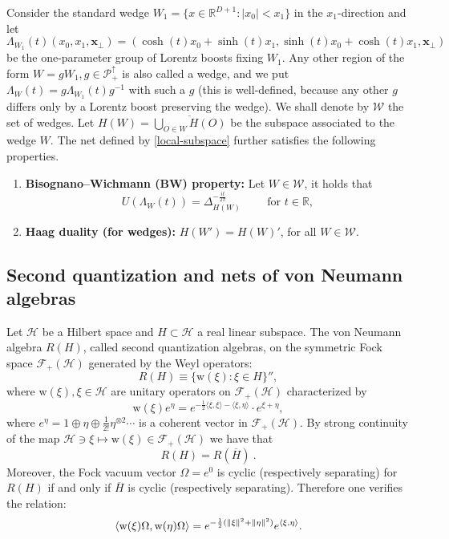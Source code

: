 \documentclass[12pt]{article}
\newcounter{axiomss}
\def\ol{\overline}
\def\RR{{\mathbb R}}
\def\H{{\mathcal H}}
\def\P{{\mathcal P}}
\def\<{\langle}
\def\>{\rangle}
\def\poincare{{\P^\uparrow_+}}
\def\tx{\pmb{x}}
\newcommand{\norm}[1]{\left\lVert#1\right\rVert}
\theoremstyle{remark}
\begin{document}
Consider the standard wedge $W_1=\{x\in\RR^{D+1}:|x_0|<x_1\}$ in the $x_1$-direction and let
\[
\Lambda_{W_1}(t)(x_0,x_1,\tx_\perp)=(\cosh(t)x_0+\sinh(t)x_1, \sinh(t)x_0+\cosh(t)x_1,\tx_\perp) 
\]
be the one-parameter group of Lorentz boosts fixing $W_1$.
Any other region of the form $W=gW_1, g \in \poincare$ is also called a wedge,
and we put $\Lambda_W(t) = g\Lambda_{W_1}(t)g^{-1}$ with such a $g$
(this is well-defined, because any other $g$ differs only by a Lorentz boost preserving the wedge).
We shall denote by $\mathcal W$ the set of wedges. Let $H(W)=\overline{\bigcup_{O\in W}H(O)}$ be the subspace associated to the wedge $W$.  The net defined by \eqref{local-subspace} further satisfies the following properties. 
\begin{enumerate}[{(SS}1{)}]
\setcounter{enumi}{\value{axiomss}} 
\item {\bf Bisognano--Wichmann (BW) property:} 
Let $W\in\mathcal W$, it holds that $$U(\Lambda_{W}(t)) = \Delta_{H(W)}^{-\frac{it}{2\pi}}\qquad \text{ for } t \in \RR,$$

\item {\bf Haag duality (for wedges):} 
$H(W')=H(W)'$, for all $W\in\mathcal W.$
\setcounter{axiomss}{\value{enumi}}
\end{enumerate}

\subsection{Second quantization and nets of von Neumann algebras}
\label{s:secq} 

Let $\H$ be a Hilbert space and $H\subset\H$ a real linear subspace.
The von Neumann algebra $R(H)$, called second quantization algebras, on the symmetric Fock space
$\mathcal{F}_+(\H)$ generated by the Weyl operators:
\begin{equation*}
R(H) \equiv \{\mathrm{w}(\xi): \xi\in H\}'',
\end{equation*}
where $\mathrm{w}(\xi), \xi \in \H$ are unitary operators on $\mathcal{F}_+(\H)$
characterized by
\[
\mathrm{w}(\xi)e^\eta = e^{-\frac12\<\xi,\xi\>-\<\xi,\eta\>}\cdot e^{\xi+\eta},
\]
where $e^\eta = 1 \oplus \eta \oplus \frac1{2!}\eta^{\otimes 2} \cdots$
is a coherent vector in $\mathcal{F}_+(\H)$.
By strong continuity of the map $\H\ni \xi\mapsto \mathrm{w}(\xi)\in \mathcal{F}_+(\H) $
we have that
\[
R(H) = R(\ol H)\ .
\]
Moreover, the Fock vacuum vector $\Omega = e^0$ is cyclic (respectively separating)
for $R(H)$ if and only if $\ol H$ is cyclic (respectively separating).
Therefore one verifies the relation:
\begin{align}\label{eq:second-quantization-identity}
	\braket{\mathrm{w}(\xi)\Omega,\mathrm{w}(\eta)\Omega}=e^{-\frac{1}{2}(\norm{\xi}^2+\norm{\eta}^2)}e^{\braket{\xi,\eta}}.
\end{align} 
\end{document}
